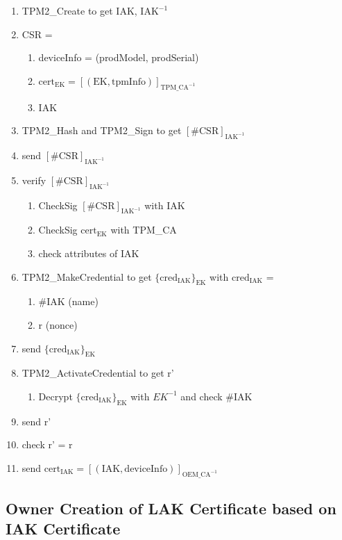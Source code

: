 \documentclass{article}
\begin{document}
\begin{enumerate}
    \item TPM2\_Create to get IAK, $\text{IAK}^{-1}$
    \item CSR =
    \begin{enumerate}
        \item deviceInfo = (prodModel, prodSerial)
        \item $\text{cert}_{\text{EK}} = [(\text{EK}, \text{tpmInfo})]_{\text{TPM\_CA}^{-1}}$
        \item IAK
    \end{enumerate}
    \item TPM2\_Hash and TPM2\_Sign to get $[\text{\#CSR}]_{\text{IAK}^{-1}}$
    \item send $[\text{\#CSR}]_{\text{IAK}^{-1}}$
    \item verify $[\text{\#CSR}]_{\text{IAK}^{-1}}$
    \begin{enumerate}
        \item CheckSig $[\text{\#CSR}]_{\text{IAK}^{-1}}$ with IAK
        \item CheckSig $\text{cert}_\text{EK}$ with TPM\_CA
        \item check attributes of IAK
    \end{enumerate}
    \item TPM2\_MakeCredential to get $\{\text{cred}_\text{IAK}\}_\text{EK}$ with $\text{cred}_\text{IAK}$ =
    \begin{enumerate}
        \item \#IAK (name)
        \item r (nonce)
    \end{enumerate}
    \item send $\{\text{cred}_\text{IAK}\}_\text{EK}$
    \item TPM2\_ActivateCredential to get r'
    \begin{enumerate}
        \item Decrypt $\{\text{cred}_\text{IAK}\}_\text{EK}$ with $EK^{-1}$ and check \#IAK
    \end{enumerate}
    \item send r'
    \item check r' = r
    \item send $\text{cert}_{\text{IAK}} = [(\text{IAK}, \text{deviceInfo})]_{\text{OEM\_CA}^{-1}}$
\end{enumerate}

\subsection*{Owner Creation of LAK Certificate based on IAK Certificate}
\end{document}
